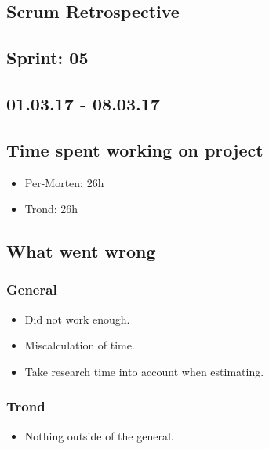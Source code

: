 \documentclass{article}
\begin{document}
\begin{center}
\section*{Scrum Retrospective}
\subsection*{Sprint: 05}
\subsection*{01.03.17 - 08.03.17}
\end{center}
\bigskip

\subsection*{Time spent working on project}
\begin{itemize}
    \item
    Per-Morten: 26h

    \item
    Trond:      26h
\end{itemize}

\subsection*{What went wrong}
\subsubsection*{General}
\begin{itemize}
    \item
    Did not work enough.

    \item
    Miscalculation of time.

    \item
    Take research time into account when estimating.
\end{itemize}

\subsubsection*{Trond}
\begin{itemize}
    \item 
    Nothing outside of the general.
\end{itemize}
\end{document}
